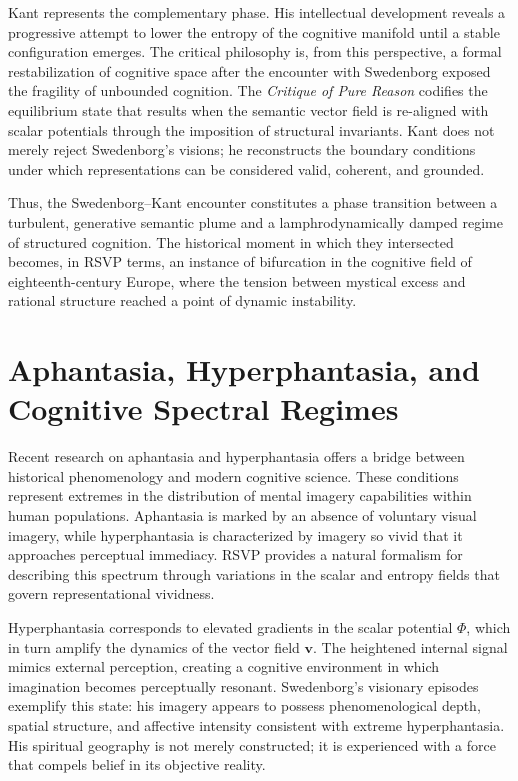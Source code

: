 \documentclass[12pt]{article}
\begin{document}
Kant represents the complementary phase. His intellectual development reveals 
a progressive attempt to lower the entropy of the cognitive manifold until a 
stable configuration emerges. The critical philosophy is, from this 
perspective, a formal restabilization of cognitive space after the 
encounter with Swedenborg exposed the fragility of unbounded cognition. The 
\emph{Critique of Pure Reason} codifies the equilibrium state that results 
when the semantic vector field is re-aligned with scalar potentials through 
the imposition of structural invariants. Kant does not merely reject 
Swedenborg's visions; he reconstructs the boundary conditions under which 
representations can be considered valid, coherent, and grounded.

Thus, the Swedenborg--Kant encounter constitutes a phase transition between a 
turbulent, generative semantic plume and a lamphrodynamically damped regime 
of structured cognition. The historical moment in which they intersected 
becomes, in RSVP terms, an instance of bifurcation in the cognitive field of 
eighteenth-century Europe, where the tension between mystical excess and 
rational structure reached a point of dynamic instability.

\section{Aphantasia, Hyperphantasia, and Cognitive Spectral Regimes}

Recent research on aphantasia and hyperphantasia offers a bridge between 
historical phenomenology and modern cognitive science. These conditions 
represent extremes in the distribution of mental imagery capabilities within 
human populations. Aphantasia is marked by an absence of voluntary visual 
imagery, while hyperphantasia is characterized by imagery so vivid that it 
approaches perceptual immediacy. RSVP provides a natural formalism for 
describing this spectrum through variations in the scalar and entropy fields 
that govern representational vividness.

Hyperphantasia corresponds to elevated gradients in the scalar potential 
$\Phi$, which in turn amplify the dynamics of the vector field $\mathbf{v}$. 
The heightened internal signal mimics external perception, creating a 
cognitive environment in which imagination becomes perceptually resonant. 
Swedenborg's visionary episodes exemplify this state: his imagery appears to 
possess phenomenological depth, spatial structure, and affective intensity 
consistent with extreme hyperphantasia. His spiritual geography is not merely 
constructed; it is experienced with a force that compels belief in its 
objective reality.
\end{document}
